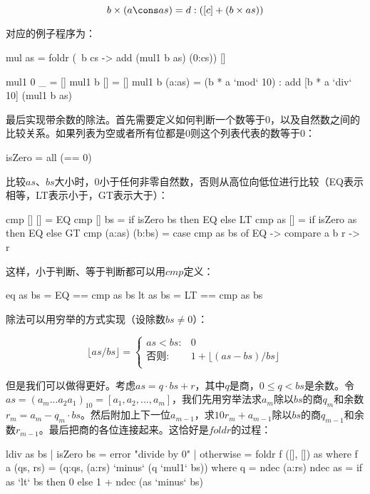 \documentclass[b5paper]{ctexart}
\begin{document}
\begin{Answer}[ref = {ex:list-others}]
{\[
b \times (a \cons as) = d : ([c] + (b \times as))
\]

对应的例子程序为：

\begin{Haskell}
mul as = foldr (\ b cs -> add (mul1 b as) (0:cs)) []

mul1 0 _ = []
mul1 b [] = []
mul1 b (a:as) = (b * a `mod` 10) : add [b * a `div` 10] (mul1 b as)
\end{Haskell}

最后实现带余数的除法。首先需要定义如何判断一个数等于0，以及自然数之间的比较关系。如果列表为空或者所有位都是0则这个列表代表的数等于0：

\begin{Haskell}
isZero = all (== 0)
\end{Haskell}

比较$as$、$bs$大小时，0小于任何非零自然数，否则从高位向低位进行比较（EQ表示相等，LT表示小于，GT表示大于）：

\begin{Haskell}
cmp [] [] = EQ
cmp [] bs = if isZero bs then EQ else LT
cmp as [] = if isZero as then EQ else GT
cmp (a:as) (b:bs) = case cmp as bs of EQ -> compare a b
                                      r -> r
\end{Haskell}

这样，小于判断、等于判断都可以用$cmp$定义：

\begin{Haskell}
eq as bs = EQ == cmp as bs
lt as bs = LT == cmp as bs
\end{Haskell}

除法可以用穷举的方式实现（设除数$bs \neq 0$）：

\[
\lfloor as / bs \rfloor = \begin{cases}
as < bs: & 0 \\
\text{否则}: & 1 + \lfloor (as - bs) / bs \rfloor \\
\end{cases}
\]

但是我们可以做得更好。考虑$as = q \cdot bs + r$，其中$q$是商，$0 \leq q < bs$是余数。令$as = (a_m...a_2a_1)_{10} = [a_1, a_2, ..., a_m]$，我们先用穷举法求$a_m$除以$bs$的商$q_m$和余数$r_m = a_m - q_m \cdot bs$。然后附加上下一位$a_{m-1}$，求$10 r_{m} + a_{m-1}$除以$bs$的商$q_{m-1}$和余数$r_{m-1}$。最后把商的各位连接起来。这恰好是$foldr$的过程：

\begin{Haskell}
ldiv as bs | isZero bs = error "divide by 0"
           | otherwise = foldr f ([], []) as where
  f a (qs, rs) = (q:qs, (a:rs) `minus` (q `mul1` bs)) where
    q =  ndec (a:rs)
  ndec as = if as `lt` bs then 0 else 1 + ndec (as `minus` bs)
\end{Haskell}
}


\end{Answer}
\end{document}
